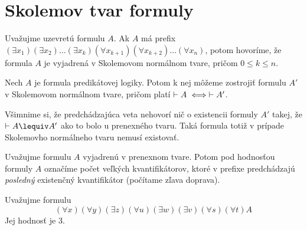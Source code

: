 \section{Skolemov tvar formuly}

\begin{definicia}
  Uvažujme uzevretú formulu $A$.
  Ak $A$ má prefix $(\exists x_1)(\exists x_2) \dots (\exists x_k)
    (\forall x_{k+1}) (\forall x_{k+2}) \dots (\forall x_n)$, potom 
    hovoríme, že formula $A$ je vyjadrená v Skolemovom normálnom
    tvare, pričom $0 \le k \le n$.
\end{definicia}

\begin{veta}
    Nech $A$ je formula predikátovej logiky. Potom k nej môžeme
    zostrojiť formulu $A'$ v Skolemovom normálnom tvare, pričom platí
    $\vdash A \iff \vdash A'$.
    \label{veta:skolem}
\end{veta}

\begin{poznamka}
    Všimnime si, že predchádzajúca veta nehovorí nič o existencii
    formuly $A'$ takej, že $\provable A \lequiv A'$ ako to
    bolo u prenexného tvaru. Taká formula totiž v prípade Skolemovho
    normálneho tvaru nemusí existovať.
\end{poznamka}

\begin{definicia}
    Uvažujme formulu $A$ vyjadrenú v prenexnom tvare. Potom pod
    hodnosťou formuly $A$ označíme počet veľkých kvantifikátorov,
    ktoré v prefixe predchádzajú \emph{posledný} existenčný
    kvantifikátor (počítame zľava doprava).
\end{definicia}

\begin{priklad}
    Uvažujme formulu
    \begin{equation*}
        (\forall x) (\forall y) (\exists z) 
        (\forall u) (\exists w) (\exists v)
        (\forall s) (\forall t) A
    \end{equation*}
    Jej hodnosť je 3.
\end{priklad}

\def\existsxton{(\exists x_1) (\exists x_2) \dots (\exists x_n)}
\def\forallxton{(\forall x_1) (\forall x_2) \dots (\forall x_n)}

